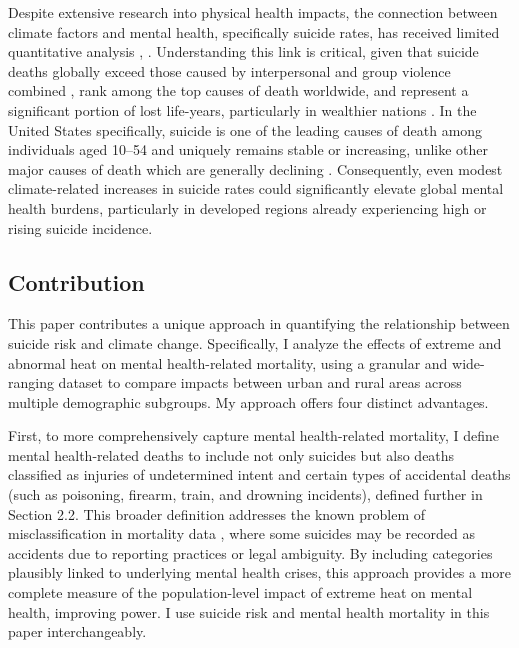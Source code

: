 \documentclass[12pt, a4paper]{article}
\begin{document}
Despite extensive research into physical health impacts, the connection between climate factors and mental health, specifically suicide rates, has received limited quantitative analysis \cite{Berry2010}, \cite{burke2018}. Understanding this link is critical, given that suicide deaths globally exceed those caused by interpersonal and group violence combined \cite{Lim2013}, rank among the top causes of death worldwide, and represent a significant portion of lost life-years, particularly in wealthier nations \cite{Lozano2013}. In the United States specifically, suicide is one of the leading causes of death among individuals aged 10–54 \cite{cdcWisqars} and uniquely remains stable or increasing, unlike other major causes of death which are generally declining \cite{Swanson2015}. Consequently, even modest climate-related increases in suicide rates could significantly elevate global mental health burdens, particularly in developed regions already experiencing high or rising suicide incidence.

\subsection{Contribution}
This paper contributes a unique approach in quantifying the relationship between suicide risk and climate change. Specifically, I analyze the effects of extreme and abnormal heat on mental health-related mortality, using a granular and wide-ranging dataset to compare impacts between urban and rural areas across multiple demographic subgroups. My approach offers four distinct advantages.

First, to more comprehensively capture mental health-related mortality, I define mental health-related deaths to include not only suicides but also deaths classified as injuries of undetermined intent and certain types of accidental deaths (such as poisoning, firearm, train, and drowning incidents), defined further in Section 2.2. This broader definition addresses the known problem of misclassification in mortality data \cite{MHClassification}, where some suicides may be recorded as accidents due to reporting practices or legal ambiguity. By including categories plausibly linked to underlying mental health crises, this approach provides a more complete measure of the population-level impact of extreme heat on mental health, improving power. I use suicide risk and mental health mortality in this paper interchangeably.
\end{document}
